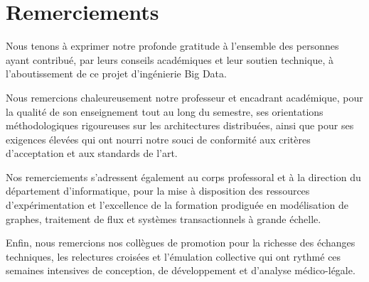 
\chapter*{Remerciements}

Nous tenons à exprimer notre profonde gratitude à l'ensemble des personnes ayant contribué, par leurs conseils académiques et leur soutien technique, à l'aboutissement de ce projet d'ingénierie Big Data.

Nous remercions chaleureusement notre professeur et encadrant académique, pour la qualité de son enseignement tout au long du semestre, ses orientations méthodologiques rigoureuses sur les architectures distribuées, ainsi que pour ses exigences élevées qui ont nourri notre souci de conformité aux critères d'acceptation et aux standards de l'art.

Nos remerciements s'adressent également au corps professoral et à la direction du département d'informatique, pour la mise à disposition des ressources d'expérimentation et l'excellence de la formation prodiguée en modélisation de graphes, traitement de flux et systèmes transactionnels à grande échelle.

Enfin, nous remercions nos collègues de promotion pour la richesse des échanges techniques, les relectures croisées et l'émulation collective qui ont rythmé ces semaines intensives de conception, de développement et d'analyse médico-légale.
